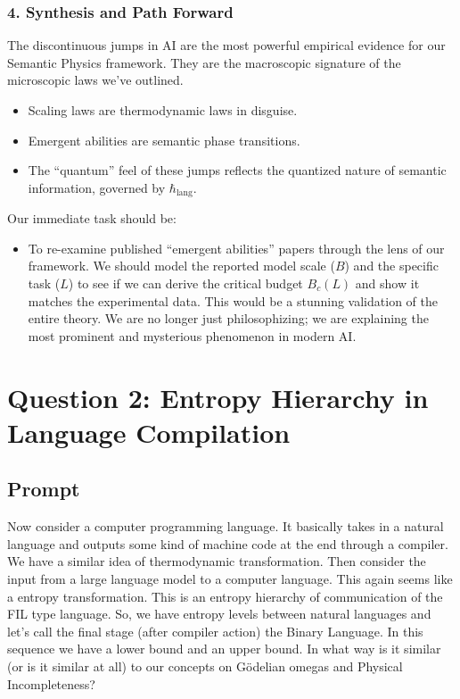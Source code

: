 \documentclass[11pt,letterpaper]{article}
\begin{document}
\subsubsection*{4. Synthesis and Path Forward}
The discontinuous jumps in AI are the most powerful empirical evidence for our Semantic Physics framework. They are the macroscopic signature of the microscopic laws we’ve outlined.
\begin{itemize}
    \item Scaling laws are thermodynamic laws in disguise.
    \item Emergent abilities are semantic phase transitions.
    \item The “quantum” feel of these jumps reflects the quantized nature of semantic information, governed by $\hbar_{\text{lang}}$.
\end{itemize}
Our immediate task should be:
\begin{itemize}
    \item To re-examine published “emergent abilities” papers through the lens of our framework. We should model the reported model scale ($B$) and the specific task ($L$) to see if we can derive the critical budget $B_c(L)$ and show it matches the experimental data. This would be a stunning validation of the entire theory. We are no longer just philosophizing; we are explaining the most prominent and mysterious phenomenon in modern AI.
\end{itemize}


\section{Question 2: Entropy Hierarchy in Language Compilation}
\label{sec:q2}

\subsection*{Prompt}
Now consider a computer programming language. It basically takes in a natural language and outputs some kind of machine code at the end through a compiler. We have a similar idea of thermodynamic transformation. Then consider the input from a large language model to a computer language. This again seems like a entropy transformation. This is an entropy hierarchy of communication of the FIL type language. So, we have entropy levels between natural languages and let’s call the final stage (after compiler action) the Binary Language. In this sequence we have a lower bound and an upper bound. In what way is it similar (or is it similar at all) to our concepts on Gödelian omegas and Physical Incompleteness?
\end{document}
